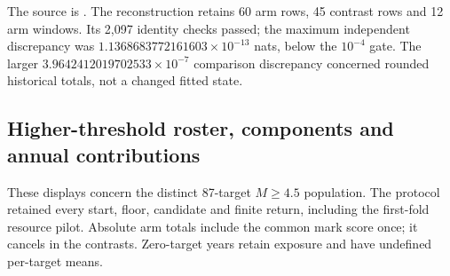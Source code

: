 The source is . The reconstruction retains 60 arm rows, 45 contrast rows and 12 arm windows. Its 2,097 identity checks passed; the maximum independent discrepancy was $1.1368683772161603\times10^{-13}$ nats, below the $10^{-4}$ gate. The larger $3.9642412019702533\times10^{-7}$ comparison discrepancy concerned rounded historical totals, not a changed fitted state.

\subsection{Higher-threshold roster, components and annual contributions}\label{app:audit11-threshold}
These displays concern the distinct 87-target $M\geq 4.5$ population. The protocol retained every start, floor, candidate and finite return, including the first-fold resource pilot. Absolute arm totals include the common mark score once; it cancels in the contrasts. Zero-target years retain exposure and have undefined per-target means.

